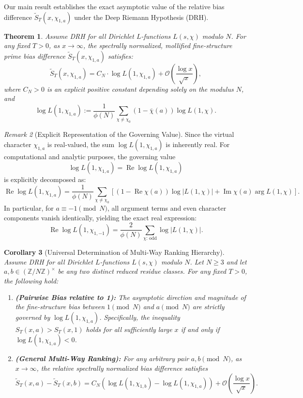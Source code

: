 \documentclass[12pt,reqno]{amsart}
\newtheorem{theorem}{Theorem}[section]
\newtheorem{corollary}[theorem]{Corollary}
\theoremstyle{definition}
\theoremstyle{remark}
\newtheorem{remark}[theorem]{Remark}
\numberwithin{equation}{section}
\begin{document}
Our main result establishes the exact asymptotic value of the relative bias difference 
$\widetilde S_T(x, \chi_{1,a})$ under the Deep Riemann Hypothesis (DRH).

\begin{theorem}\label{thm:intro_main}
Assume DRH for all Dirichlet $L$-functions $L(s,\chi)$ modulo $N$. 
For any fixed $T>0$, as $x \to \infty$, the spectrally normalized, mollified fine-structure prime bias difference $\widetilde{S}_T(x, \chi_{1,a})$ satisfies:
\[
\widetilde{S}_T(x, \chi_{1,a}) = C_N \cdot \log L(1, \chi_{1,a}) + \mathcal{O}\left(\frac{\log x}{\sqrt x}\right),
\]
where $C_N > 0$ is an explicit positive constant depending solely on the modulus $N$, and
\[
\log L(1, \chi_{1,a}) := \frac{1}{\phi(N)} \sum_{\chi \neq \chi_0} (1 - \bar{\chi}(a)) \log L(1, \chi).
\]
\end{theorem}

\begin{remark}[Explicit Representation of the Governing Value]
Since the virtual character $\chi_{1,a}$ is real-valued, the sum $\log L(1, \chi_{1,a})$ is inherently real. 
For computational and analytic purposes, the governing value 
\[
\log L(1, \chi_{1,a}) = \operatorname{Re} \log L(1, \chi_{1,a})
\]
is explicitly decomposed as:
\[
\operatorname{Re} \log L(1, \chi_{1,a}) 
= \frac{1}{\phi(N)} \sum_{\chi \ne \chi_0} 
\left[ \left(1 - \operatorname{Re}\chi(a)\right) \log \vert{}L(1, \chi)\vert{} 
+ \operatorname{Im}\chi(a) \arg L(1, \chi) \right].
\]
In particular, for $a \equiv -1 \pmod N$, all argument terms and even character components vanish identically,
yielding the exact real expression:
\[
\operatorname{Re} \log L(1, \chi_{1,-1}) = \frac{2}{\phi(N)} \sum_{\chi \text{: odd}} \log \vert{}L(1, \chi)\vert{}.
\]
\end{remark}

\begin{corollary}[Universal Determination of Multi-Way Ranking Hierarchy]
\label{cor:ranking_hierarchy}
Assume DRH for all Dirichlet $L$-functions $L(s,\chi)$ modulo $N$. Let $N \ge 3$ and let $a, b \in (\mathbb{Z}/N\mathbb{Z})^\times$ be any two distinct reduced residue classes. For any fixed $T > 0$, the following hold:
\begin{enumerate}
    \item \textbf{(Pairwise Bias relative to 1):} The asymptotic direction and magnitude of the fine-structure bias between $1 \pmod N$ and $a \pmod N$ are strictly governed by \linebreak
    $\log L(1, \chi_{1,a})$. Specifically, the inequality $S_T(x,a) > S_T(x,1)$ holds for all sufficiently large $x$ if and only if $\log L(1, \chi_{1,a}) < 0$.
    \item \textbf{(General Multi-Way Ranking):} For any arbitrary pair $a, b \pmod N$, as $x \to \infty$, the relative spectrally normalized bias difference satisfies
    \begin{equation}
    \widetilde{S}_T(x,a) - \widetilde{S}_T(x,b) = C_N \left( \log L(1, \chi_{1,b}) - \log L(1, \chi_{1,a}) \right) + \mathcal{O}\left( \frac{\log x}{\sqrt{x}} \right).
    \end{equation}
\end{enumerate}
\end{corollary}
\end{document}
